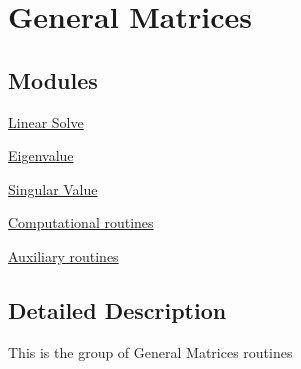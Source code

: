 \hypertarget{group__GE}{}\section{General Matrices}
\label{group__GE}
\subsection*{Modules}
\begin{DoxyCompactItemize}
\item 
\hyperlink{group__solveGE}{Linear Solve}
\item 
\hyperlink{group__eigenGE}{Eigenvalue}
\item 
\hyperlink{group__singGE}{Singular Value}
\item 
\hyperlink{group__computationalGE}{Computational routines}
\item 
\hyperlink{group__auxiliaryGE}{Auxiliary routines}
\end{DoxyCompactItemize}


\subsection{Detailed Description}
This is the group of General Matrices routines 